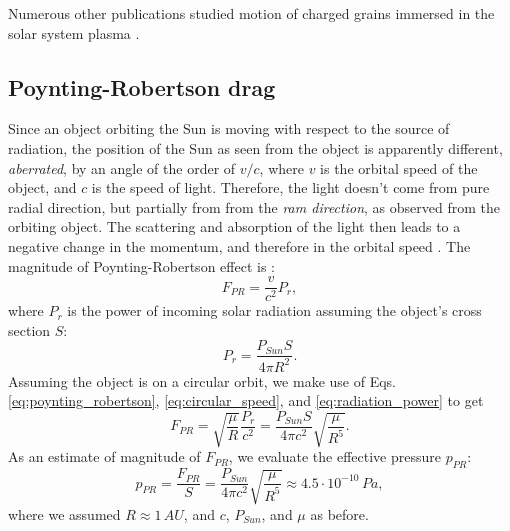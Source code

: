 Numerous other publications studied motion of charged grains immersed in the solar system plasma \citep{mann2007nanoparticles,horanyi1996charged,juhasz2013dynamics,stamm2019dust,czechowski2021dynamics,poppe2022effects,rusk1988effect}.

\subsection{Poynting-Robertson drag} \label{ch:pr_drag}

Since an object orbiting the Sun is moving with respect to the source of radiation, the position of the Sun as seen from the object is apparently different, \textit{aberrated}, by an angle of the order of $v/c$, where $v$ is the orbital speed of the object, and $c$ is the speed of light. Therefore, the light doesn't come from pure radial direction, but partially from from the \textit{ram direction}, as observed from the orbiting object. The scattering and absorption of the light then leads to a negative change in the momentum, and therefore in the orbital speed \citep{poynting1903radiation}. The magnitude of Poynting-Robertson effect is \citep{robertson1937dynamical}:
\begin{equation}
    F_{PR} = \frac{v}{c^2} P_{r},
    \label{eq:poynting_robertson}
\end{equation}
where $P_r$ is the power of incoming solar radiation assuming the object's cross section $S$: 
\begin{equation}
    P_{r} = \frac{P_{Sun} S}{4 \pi R^2}.
    \label{eq:radiation_power}
\end{equation}
Assuming the object is on a circular orbit, we make use of Eqs. \ref{eq:poynting_robertson}, \ref{eq:circular_speed}, and \ref{eq:radiation_power} to get
\begin{equation}
    F_{PR} = \sqrt{\frac{\mu}{R}} \frac{P_{r}}{c^2} = \frac{P_{Sun}S}{4 \pi c^2} \sqrt{\frac{\mu}{R^5}}. 
\end{equation}
As an estimate of magnitude of $F_{PR}$, we evaluate the effective pressure $p_{PR}$:
\begin{equation}
    p_{PR} = \frac{F_{PR}}{S} = \frac{P_{Sun}}{4 \pi c^2} \sqrt{\frac{\mu}{R^5}} \approx 4.5 \cdot 10^{-10} \, \si{Pa},
\end{equation}
where we assumed $R \approx 1 \, \si{AU}$, and $c$, $P_{Sun}$, and $\mu$ as before.

